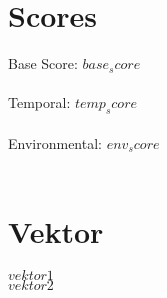 \documentclass[12pt,oneside]{article}
\title{\vspace{-4.0cm}\assetname}
\author{\vul}
\newcommand{\base}{$base_score$}
\newcommand{\temporal}{$temp_score$}
\newcommand{\environmental}{$env_score$}
\newcommand{\vektora}{$vektor1$}
\newcommand{\vektorb}{$vektor2$}
\begin{document}
	
	
	
	\maketitle


	\vspace{2.0cm}
	\section*{Scores}
	
 
		{\Large Base Score: \base } 
		\\\\
		{\Large Temporal: \temporal }
		\\\\
		{\Large Environmental: \environmental }
		\\\\
		
	

    
	\section*{Vektor}
	\vektora \\
	\vektorb
\end{document}
